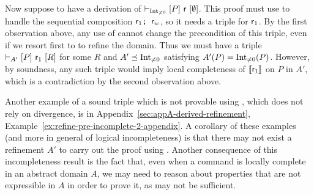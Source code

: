 \begin{example}
	Now suppose to have a derivation of $\vdash_{\text{Int}_{\neq 0}}\nobreak[P]~\mathsf{r}~[\emptyset]$. This proof must use  to handle the sequential composition $\mathsf{r}_1 \texttt{; }\mathsf{r}_w$, so it needs a triple for $\mathsf{r}_1$. By the first observation above, any use of  cannot change the precondition of this triple, even if we resort first to  to refine the domain. Thus we must have a triple $\vdash_{A'}\nobreak[P]~\mathsf{r}_1~[R]$ for some $R$ and $A' \preceq \text{Int}_{\neq 0}$ satisfying $A'(P) = \text{Int}_{\neq 0}(P)$. However, by soundness, any such triple would imply local completeness of $\llbracket\mathsf{r}_1\rrbracket$ on $P$ in $A'$, which is a contradiction by the second observation above.
\end{example}

Another example of a sound triple which is not provable using , which does not rely on divergence, is in Appendix~\ref{sec:appA-derived-refinement}, Example~\ref{ex:refine-pre-incomplete-2-appendix}.
A corollary of these examples (and more in general of logical incompleteness) is that there may not exist a refinement $A'$ to carry out the proof using .
Another consequence of this incompleteness result is the fact that, even when a command is locally complete in an abstract domain $A$, we may need to reason about properties that are not expressible in $A$ in order to prove it, as  may not be sufficient.

